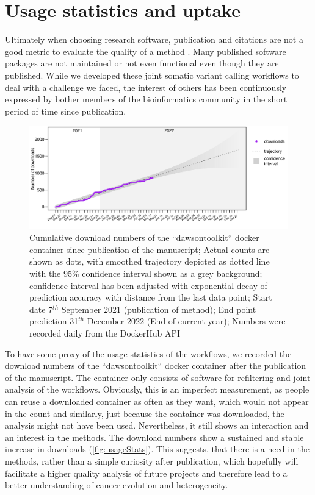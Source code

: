 \section[Usage]{Usage statistics and uptake}
\label{variantcalling-sec:usage}
Ultimately when choosing research software, publication and citations are not a good metric to evaluate the quality of a method \cite{Gardner2022}. Many published software packages are not maintained or not even functional even though they are published. While we developed these joint somatic variant calling workflows to deal with a challenge we faced, the interest of others has been continuously expressed by bother members of the bioinformatics community  in the short period of time since publication.

\begin{figure}[!ht]
\centering
\includegraphics[width=.99\linewidth]{Figures/jointVariantCalling/dawsontoolkitDownloads.pdf}
\caption[Usage statistics joint workflows]{Cumulative download numbers of the ``dawsontoolkit`` docker container since publication of the manuscript; Actual counts are shown as dots, with smoothed trajectory depicted as dotted line with the 95\% confidence interval shown as a grey background; confidence interval has been adjusted with exponential decay of prediction accuracy with distance from the last data point; Start date 7$^{th}$ September 2021 (publication of method); End point prediction 31$^{th}$ December 2022 (End of current year); Numbers were recorded daily from the DockerHub API}\label{fig:usageStats}
\end{figure}

To have some proxy of the usage statistics of the workflows, we recorded the download numbers of the ``dawsontoolkit`` docker container after the publication of the manuscript. The container only consists of software for refiltering and joint analysis of the workflows. Obviously, this is an imperfect measurement, as people can reuse a downloaded container as often as they want, which would not appear in the count and similarly, just because the container was downloaded, the analysis might not have been used. Nevertheless, it still shows  an interaction and an interest in the methods. The download numbers show a sustained and stable increase in downloads (\autoref{fig:usageStats}). This suggests, that there is a need in the methods, rather than a simple curiosity after publication, which hopefully will facilitate a higher quality analysis of future projects and therefore lead to a better understanding of cancer evolution and heterogeneity.
